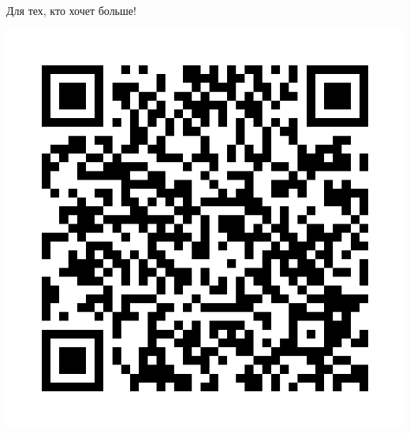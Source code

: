 \documentclass[final]{beamer}
\newlength{\onecolwid}
\begin{document}
\begin{frame}[t]
\begin{columns}[t]
\begin{column}{\onecolwid}
\begin{block}{Для тех, кто хочет больше!}
\begin{center}
	\includegraphics[scale=0.3]{qrcode.png}
\end{center}

\end{block}


\end{column} %

\end{columns} %

\end{frame} %
\end{document}
